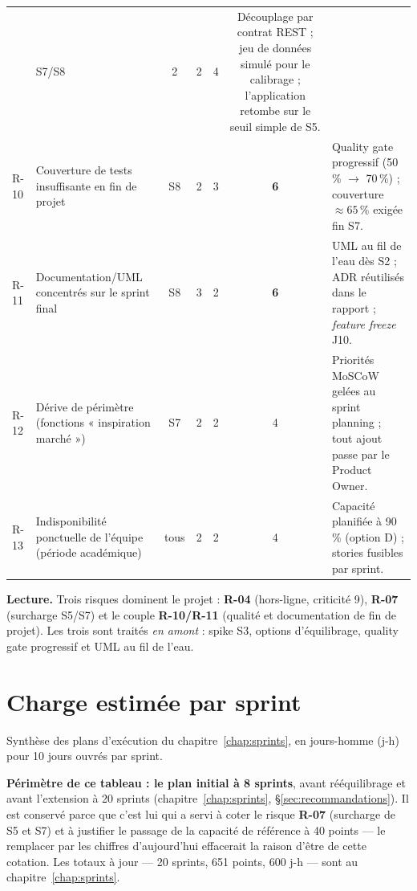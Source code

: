 {\begin{longtable}{lp{4.9cm}ccccp{5.1cm}}
     & S7/S8 & 2 & 2 & 4
     & Découplage par contrat REST ; jeu de données simulé pour le calibrage ;
       l'application retombe sur le seuil simple de S5. \\
\addlinespace
R-10 & Couverture de tests insuffisante en fin de projet
     & S8 & 2 & 3 & \textbf{6}
     & Quality gate progressif (50\,\% $\rightarrow$ 70\,\%) ; couverture $\approx 65\,\%$ exigée fin S7. \\
\addlinespace
R-11 & Documentation/UML concentrés sur le sprint final
     & S8 & 3 & 2 & \textbf{6}
     & UML au fil de l'eau dès S2 ; ADR réutilisés dans le rapport ; \emph{feature freeze} J10. \\
\addlinespace
R-12 & Dérive de périmètre (fonctions « inspiration marché »)
     & S7 & 2 & 2 & 4
     & Priorités MoSCoW gelées au sprint planning ; tout ajout passe par le Product Owner. \\
\addlinespace
R-13 & Indisponibilité ponctuelle de l'équipe (période académique)
     & tous & 2 & 2 & 4
     & Capacité planifiée à 90\,\% (option D) ; stories fusibles par sprint. \\
\end{longtable}
}

\begin{encadre}
\textbf{Lecture.} Trois risques dominent le projet : \textbf{R-04}
(hors-ligne, criticité 9), \textbf{R-07} (surcharge S5/S7) et le couple
\textbf{R-10/R-11} (qualité et documentation de fin de projet). Les trois
sont traités \emph{en amont} : spike S3, options d'équilibrage, quality gate
progressif et UML au fil de l'eau.
\end{encadre}

\section{Charge estimée par sprint}

Synthèse des plans d'exécution du chapitre~\ref{chap:sprints}, en
jours-homme (j-h) pour 10 jours ouvrés par sprint.

\textbf{Périmètre de ce tableau : le plan initial à 8 sprints}, avant
rééquilibrage et avant l'extension à 20 sprints (chapitre~\ref{chap:sprints},
§\ref{sec:recommandations}). Il est conservé parce que c'est lui qui a servi à
coter le risque \textbf{R-07} (surcharge de S5 et S7) et à justifier le passage
de la capacité de référence à 40 points --- le remplacer par les chiffres
d'aujourd'hui effacerait la raison d'être de cette cotation. Les totaux à jour
--- 20 sprints, 651 points, 600 j-h --- sont au chapitre~\ref{chap:sprints}.

